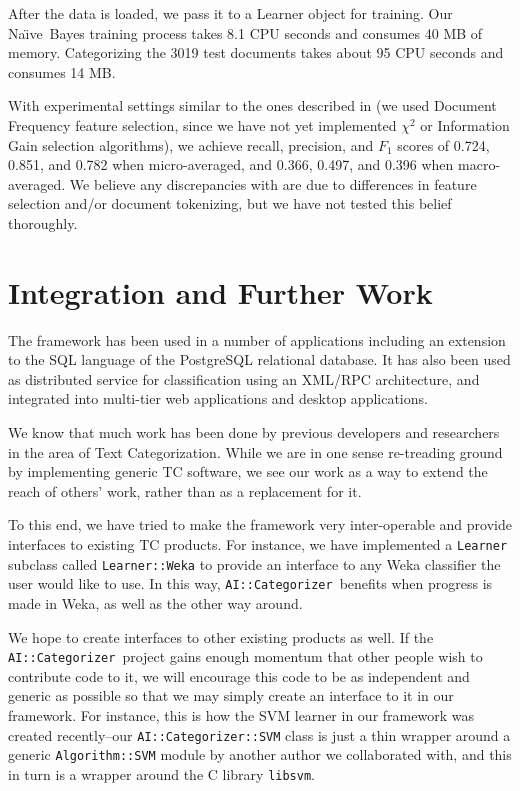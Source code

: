 \documentclass[twocolumn]{article}
\newcommand{\naive}{Na\"\i ve}
\newcommand{\class}[1]{\texttt{#1}}
\newcommand{\aicat}{\texttt{AI::Cat\-e\-gor\-i\-zer}}
\begin{document}
After the data is loaded, we pass it to a Learner object for training.
Our \naive\ Bayes training process takes 8.1 CPU seconds and consumes
40 MB of memory.  Categorizing the 3019 test documents takes about 95
CPU seconds and consumes 14 MB.

With experimental settings similar to the ones described in
\cite{yang:99} (we used Document Frequency feature selection, since we
have not yet implemented $\chi^2$ or Information Gain selection
algorithms), we achieve recall, precision, and $F_1$ scores of 0.724,
0.851, and 0.782 when micro-averaged, and 0.366, 0.497, and 0.396 when
macro-averaged.  We believe any discrepancies with \cite{yang:99} are
due to differences in feature selection and/or document tokenizing,
but we have not tested this belief thoroughly.

\section{Integration and Further Work}


The framework has been used in a number of applications including an
extension to the SQL language of the PostgreSQL relational
database. It has also been used as distributed service for
classification using an XML/RPC architecture, and integrated into
multi-tier web applications and desktop applications.

We know that much work has been done by previous developers and
researchers in the area of Text Categorization.  While we are in one
sense re-treading ground by implementing generic TC software, we see
our work as a way to extend the reach of others' work, rather than as
a replacement for it.

To this end, we have tried to make the framework very inter-operable
and provide interfaces to existing TC products.  For instance, we have
implemented a \class{Learner} subclass called \class{Learner::Weka}
to provide an interface to any Weka classifier the user would like to
use.  In this way, \aicat\ benefits when progress is
made in Weka, as well as the other way around.

We hope to create interfaces to other existing products as well.  If the
\aicat\ project gains enough momentum that other
people wish to contribute code to it, we will encourage this code to
be as independent and generic as possible so that we may simply
create an interface to it in our framework.  For instance, this is 
how the SVM learner in our framework was created recently--our
\aicat\class{::SVM} class is just a thin wrapper around a
generic \class{Algorithm::SVM} module by another author we
collaborated with, and this in turn is a wrapper around the C library
\texttt{libsvm}.
\end{document}

